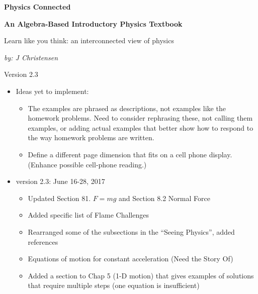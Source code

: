 \documentclass[11pt,letter,openany,makeidx]{book}
\begin{document}

\begin{titlepage}
	\centering
	{\Huge\bfseries Physics Connected\par}
	\vspace{1cm}
	{\Large\bfseries An Algebra-Based Introductory Physics Textbook\par}
	\vspace{1cm}
	{\large Learn like you think: an interconnected view of physics\par}
	\vspace{2cm}
	{\Large\itshape by: J Christensen\par}
	\vfill
\begin{ForReviewer}
	Version 2.3\par
	{\footnotesize
    \begin{itemize}
    \item Ideas yet to implement:
        \begin{itemize}
        \item The examples are phrased as descriptions, not examples like the homework problems.  Need to consider rephrasing these, not calling them examples, or adding actual examples that better show how to respond to the way homework problems are written.
        \item Define a different page dimension that fits on a cell phone display.  (Enhance possible cell-phone reading.)
        \end{itemize}
    \item version 2.3: June 16-28, 2017
        \begin{itemize}
        \item Updated Section 81. $F=mg$ and Section 8.2 Normal Force
        \item Added specific list of Flame Challenges
        \item Rearranged some of the subsections in the ``Seeing Physics'', added references
        \item Equations of motion for constant acceleration (Need the Story Of)
        \item Added a section to Chap 5 (1-D motion) that gives examples of solutions that require multiple steps  (one equation is insufficient)

\end{itemize}
\end{itemize}}
\end{ForReviewer}
\end{titlepage}
\end{document}
